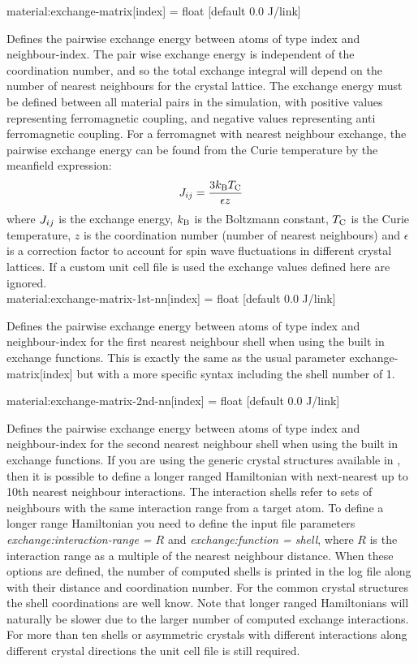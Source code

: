 {\zicf material:exchange-matrix[index] = float [default 0.0 J/link]}
 Defines the pairwise
exchange energy between atoms of type index and neighbour-index. The pair wise
exchange energy is independent of the coordination number, and so the total
exchange integral will depend on the number of nearest neighbours for the
crystal lattice. The exchange energy must be defined between all material pairs
in the simulation, with positive values representing ferromagnetic coupling, and
negative values representing anti ferromagnetic coupling. For a ferromagnet with
nearest neighbour exchange, the pairwise exchange energy can be found from the
Curie temperature by the meanfield expression:
\begin{equation*}
J_{ij} = \frac{3k_\mathrm{B}T_{\mathrm{C}}}{\epsilon z}
\end{equation*}
where $J_{ij}$ is the exchange energy, $k_\mathrm{B}$ is the Boltzmann constant, $T_{\mathrm{C}}$ is
 the Curie temperature, $z$ is the coordination number (number of nearest
 neighbours) and $\epsilon$ is a correction factor to account for spin wave
 fluctuations in different crystal lattices. If a custom unit cell file is used
 the exchange values defined here are ignored.\\

{\zicf material:exchange-matrix-1st-nn[index] = float [default 0.0 J/link]}
Defines the pairwise exchange energy between atoms of type index and
neighbour-index for the first nearest neighbour shell when using the built in
exchange functions. This is exactly the same as the usual parameter
exchange-matrix[index] but with a more specific syntax including the shell
number of 1.

{\zicf material:exchange-matrix-2nd-nn[index] = float [default 0.0 J/link]}
Defines the pairwise exchange energy between atoms of type index and
neighbour-index for the second nearest neighbour shell when using the built in
exchange functions. If you are using the generic crystal structures available in
 \vampire, then it is possible to define a longer ranged Hamiltonian with
 next-nearest up to 10th nearest neighbour interactions. The interaction shells
 refer to sets of neighbours with the same interaction range from a target atom.
 To define a longer range Hamiltonian you need to define the input file
 parameters \textit{exchange:interaction-range = $R$} and
 \textit{exchange:function = shell}, where $R$ is the interaction range as a
 multiple of the nearest neighbour distance. When these options are defined,
 the number of computed shells is printed in the log file along with their
 distance and coordination number. For the common crystal structures the shell
 coordinations are well know. Note that longer ranged Hamiltonians will
 naturally be slower due to the larger number of computed exchange interactions.
 For more than ten shells or asymmetric crystals with different interactions
 along different crystal directions the unit cell file is still required.

